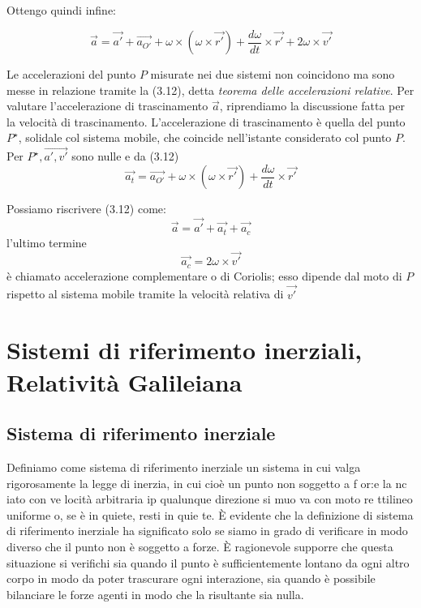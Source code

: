 \documentclass[class=book, crop=false, oneside, 12pt]{standalone}
\begin{document}
Ottengo quindi infine:

\begin{equation}
    \overrightarrow{a} = \overrightarrow{a'} + \overrightarrow{a_{O'}} + \omega \times ( \omega \times \overrightarrow{r'}) + \frac{d \omega}{dt} \times \overrightarrow{r'} + 2 \omega \times \overrightarrow{v'}
\end{equation}

Le accelerazioni del punto \(P\) misurate nei due sistemi non coincidono ma sono messe in relazione tramite la (3.12), detta \emph{teorema delle accelerazioni relative}.
Per valutare l'accelerazione di trascinamento \(\overrightarrow{a}\), riprendiamo la discussione fatta per la velocità di trascinamento. 
L'accelerazione di trascinamento è quella del punto \(P^{\star}\), solidale col sistema mobile, che coincide nell'istante considerato col punto \(P\). 
Per \(P^{\star}, \overrightarrow{a', v'}\) sono nulle e da (3.12)
\begin{equation}
    \overrightarrow{a_t} = \overrightarrow{a_{O'}} + \omega \times (\omega \times \overrightarrow{r'}) + \frac{d \omega }{dt} \times \overrightarrow{r'}
\end{equation}

Possiamo riscrivere (3.12) come:
\begin{equation}
    \overrightarrow{a} = \overrightarrow{a'} + \overrightarrow{a_t} + \overrightarrow{a_c}
\end{equation}
l'ultimo termine
\begin{equation*}
    \overrightarrow{a_c} = 2 \omega \times \overrightarrow{v'}
\end{equation*}
è chiamato accelerazione complementare o di Coriolis; esso dipende dal moto di \(P\) rispetto al sistema mobile tramite la velocità relativa di \(\overrightarrow{v'}\)

\section{Sistemi di riferimento inerziali, Relatività Galileiana}

\subsection{Sistema di riferimento inerziale}

Definiamo come sistema di riferimento inerziale un sistema in cui valga rigorosamente la legge di inerzia, in cui cioè un punto non soggetto a f or:e la nc iato con ve locità arbitraria ip qualunque direzione si muo va con moto re ttilineo uniforme o, se è  in quiete, resti  in quie te.
È evidente che la definizione di sistema di riferimento inerziale ha significato solo se siamo in grado di verificare in modo diverso che il punto non è soggetto a forze. 
È ragionevole supporre che questa situazione si verifichi sia quando il punto è sufficientemente lontano da ogni altro corpo in modo da poter trascurare  ogni interazione, sia quando è possibile bilanciare le forze agenti in modo che la risultante sia nulla.
\end{document}
